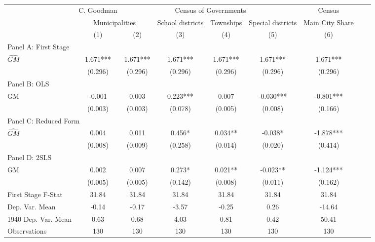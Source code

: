  \begin{tabular}{l*{8}{c}} \toprule
&\multicolumn{1}{c}{C. Goodman}&\multicolumn{4}{c}{Census of Governments}&\multicolumn{1}{c}{Census}\\\cmidrule(lr){2-2}\cmidrule(lr){3-6}\cmidrule(lr){7-7}
&\multicolumn{2}{c}{Municipalities}&\multicolumn{1}{c}{School districts}&\multicolumn{1}{c}{Townships}&\multicolumn{1}{c}{Special districts}&\multicolumn{1}{c}{Main City Share}\\\cmidrule(lr){2-3}\cmidrule(lr){4-6}\cmidrule(lr){7-7}
&\multicolumn{1}{c}{(1)}&\multicolumn{1}{c}{(2)}&\multicolumn{1}{c}{(3)}&\multicolumn{1}{c}{(4)}&\multicolumn{1}{c}{(5)}&\multicolumn{1}{c}{(6)}\\
\cmidrule(lr){1-7}
\multicolumn{6}{l}{Panel A: First Stage}\\
\cmidrule(lr){1-7}
$\widehat{GM}$  &    1.671***&    1.671***&    1.671***&    1.671***&    1.671***&    1.671***\\
                &  (0.296)   &  (0.296)   &  (0.296)   &  (0.296)   &  (0.296)   &  (0.296)   \\
\cmidrule(lr){1-7}
\multicolumn{6}{l}{Panel B: OLS}\\
\cmidrule(lr){1-7}
GM              &   -0.001   &    0.003   &    0.223***&    0.007   &   -0.030***&   -0.801***\\
                &  (0.003)   &  (0.003)   &  (0.078)   &  (0.005)   &  (0.008)   &  (0.166)   \\
\cmidrule(lr){1-7}
\multicolumn{6}{l}{Panel C: Reduced Form}\\
\cmidrule(lr){1-7}
$\widehat{GM}$  &    0.004   &    0.011   &    0.456*  &    0.034** &   -0.038*  &   -1.878***\\
                &  (0.008)   &  (0.009)   &  (0.258)   &  (0.014)   &  (0.020)   &  (0.414)   \\
\cmidrule(lr){1-7}
\multicolumn{6}{l}{Panel D: 2SLS}\\
\cmidrule(lr){1-7}
GM              &    0.002   &    0.007   &    0.273*  &    0.021** &   -0.023** &   -1.124***\\
                &  (0.005)   &  (0.005)   &  (0.142)   &  (0.008)   &  (0.011)   &  (0.162)   \\
\midrule
First Stage F-Stat&    31.84   &    31.84   &    31.84   &    31.84   &    31.84   &    31.84   \\
Dep. Var. Mean  &    -0.14   &    -0.17   &    -3.57   &    -0.25   &     0.26   &   -14.64   \\
1940 Dep. Var. Mean&     0.63   &     0.68   &     4.03   &     0.81   &     0.42   &    50.41   \\
Observations    &      130   &      130   &      130   &      130   &      130   &      130   \\
       \bottomrule \end{tabular}
